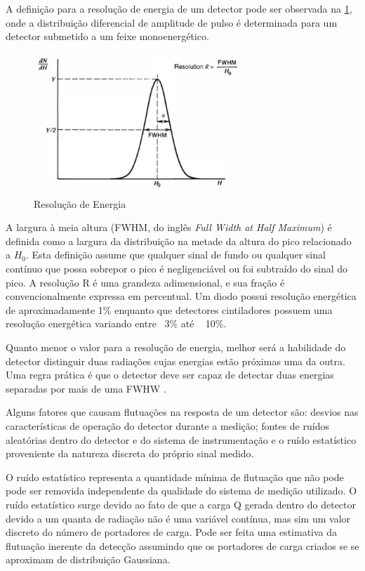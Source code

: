 \documentclass[11pt,a4paper]{article}
\begin{document}
		A definição para a resolução de energia de um detector pode ser observada na  \ref{fig:resolucaoDeEnergia}, onde a distribuição diferencial de amplitude de pulso é determinada para um detector submetido a um feixe monoenergético. 

			\begin{figure}[h]
				\centering
				\includegraphics[width=0.7\textwidth]{Imagens/resolucaoDeEnergia.jpg}
				\caption{Resolução de Energia}
				\label{fig:resolucaoDeEnergia}
			\end{figure}


		A largura à meia altura (FWHM,  do inglês \textit{Full Width at Half Maximum}) é definida como a largura da distribuição na metade da altura do pico relacionado a $H_0$. Esta definição assume que qualquer sinal de fundo ou qualquer sinal contínuo que possa sobrepor o pico é negligenciável ou foi subtraído do sinal do pico. A resolução R é uma grandeza adimensional, e  sua fração é convencionalmente expressa em percentual. Um diodo possui resolução energética de aproximadamente 1\% enquanto que detectores cintiladores possuem uma resolução energética variando entre ~3\% até ~ 10\%.

		Quanto menor o valor para a resolução de energia, melhor será a habilidade do detector distinguir duas radiações cujas energias estão próximas uma da outra. Uma regra prática é que o detector deve ser capaz de detectar duas energias separadas por mais de uma FWHW .

		Alguns fatores que causam flutuações na resposta de um detector são: desvios nas características de operação do detector durante a medição; fontes de ruídos aleatórias dentro do detector e do sistema de instrumentação e o ruído estatístico proveniente da natureza discreta do próprio sinal medido. 
		
		O ruído estatístico representa a quantidade mínima de flutuação que não pode pode ser removida independente da qualidade do sistema de medição utilizado. O ruído estatístico surge devido ao fato de que a carga Q gerada dentro do detector devido a um quanta de radiação  não é uma variável contínua, mas sim um valor discreto do número de portadores de carga. Pode ser feita uma estimativa da flutuação inerente da detecção assumindo que os portadores de carga criados se se aproximam de distribuição Gaussiana.
\end{document}
